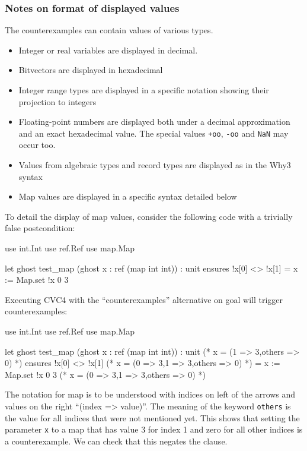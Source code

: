 \subsubsection{Notes on format of displayed values}

The counterexamples can contain values of various types.
\begin{itemize}
\item Integer or real variables are displayed in decimal.
\item Bitvectors are displayed in hexadecimal
\item Integer range types are displayed in a specific notation showing their projection to integers
\item Floating-point numbers are displayed both under a decimal approximation and an exact hexadecimal value. The special values \texttt{+oo}, \texttt{-oo} and \texttt{NaN} may occur too.
\item Values from algebraic types and record types are displayed as in the Why3 syntax
\item Map values are displayed in a specific syntax detailed below
\end{itemize}

To detail the display of map values, consider the following code with
a trivially false postcondition:
\begin{whycode}
  use int.Int
  use ref.Ref
  use map.Map

  let ghost test_map (ghost x : ref (map int int)) : unit
    ensures { !x[0] <> !x[1] }
  =
    x := Map.set !x 0 3
\end{whycode}
Executing CVC4 with the ``counterexamples'' alternative on goal will trigger
counterexamples:
\begin{whycode}
  use int.Int
  use ref.Ref
  use map.Map

  let ghost test_map (ghost x : ref (map int int)) : unit
  (* x = (1 => 3,others => 0) *)
    ensures { !x[0] <> !x[1] }
    (* x = (0 => 3,1 => 3,others => 0) *)
  =
    x := Map.set !x 0 3
    (* x = (0 => 3,1 => 3,others => 0) *)
\end{whycode}

The notation for map is to be understood with indices on left of the arrows and
values on the right ``(index => value)''. The meaning of the keyword \texttt{others} is
the value for all indices that were not mentioned yet. This shows that setting
the parameter \texttt{x} to a map that has value 3 for index 1 and zero for all other
indices is a counterexample. We can check that this negates the
 clause.

